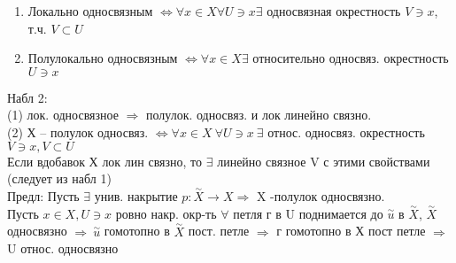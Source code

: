	\begin{enumerate}
		\item Локально односвязным $\Leftrightarrow \forall x\in X \forall U\ni x \exists$ односвязная окрестность $V\ni x$, т.ч. $V\subset U$
		\item Полулокально односвязным $\Leftrightarrow \forall x\in X \exists$ относительно односвяз. окрестность $U\ni x$
	\end{enumerate}
	Набл 2:\\
	(1) лок. односвязное $\Rightarrow$ полулок. односвяз. и лок линейно связно.\\
	(2) Х -- полулок односвяз. $\Leftrightarrow \forall x \in X\ \forall U\ni x\ \exists$ относ. односвяз. окрестность $V\ni x, V\subset U$\\
	Если вдобавок Х лок лин связно, то $\exists$ линейно связное V с этими свойствами (следует из набл 1)\\
	Предл: Пусть $\exists$ унив. накрытие $p: \overset{\sim}{X} \rightarrow X \Rightarrow$ X -полулок односвязно.\\
	Пусть $x\in X, U\ni x$ ровно накр. окр-ть $\forall$ петля г в U поднимается до $\overset{\sim}{u}$ в $\overset{\sim}{X}$, $\overset{\sim}{X}$ односвязно $\Rightarrow\ \overset{\sim}{u}$ гомотопно в $\overset{\sim}{X}$ пост. петле $\Rightarrow$ г гомотопно в Х пост петле $\Rightarrow$ U относ. односвязно


\newpage

